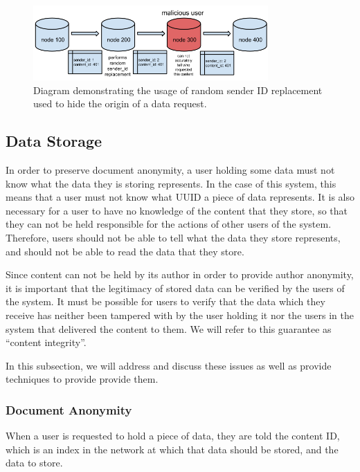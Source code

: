 \begin{figure}[H]
    \centering
    \includegraphics[width=0.8\textwidth]{img/sender_id.png}
    \caption{Diagram demonstrating the usage of random sender ID replacement used to hide the origin of a data request.}
    \label{fig:sender_id}
\end{figure}


\subsection{Data Storage}


In order to preserve document anonymity, a user holding some data must not know what the data they is storing represents.
In the case of this system, this means that a user must not know what UUID a piece of data represents. It is also necessary for a
user to have no knowledge of the content that they store, so that they can not be held responsible for the actions of other users
of the system. Therefore, users should not be able to tell what the data they store represents, and should not be able to read the
data that they store.

Since content can not be held by its author in order to provide author anonymity, it is important that the legitimacy of stored data
can be verified by the users of the system. It must be possible for users to verify that the data which they receive has neither been
tampered with by the user holding it nor the users in the system that delivered the content to them. We will refer to this guarantee as
``content integrity''.

In this subsection, we will address and discuss these issues as well as provide techniques to provide provide them.

\subsubsection{Document Anonymity}

When a user is requested to hold a piece of data, they are told the content ID, which is an index in the network at which that data should
be stored, and the data to store.

